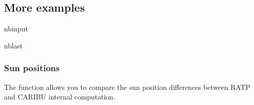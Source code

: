 \documentclass[letterpaper,10pt,english]{sphinxmanual}
\begin{document}
\subsection{More examples}
\label{\detokenize{more_examples:More-examples}}\label{\detokenize{more_examples::doc}}
\begin{sphinxuseclass}{nbinput}
\begin{sphinxuseclass}{nblast}
{
\begin{sphinxVerbatim}[commandchars=\\\{\}]
\llap{\color{nbsphinxin}[1]:\,\hspace{\fboxrule}\hspace{\fboxsep}}   
   
   
\end{sphinxVerbatim}
}

\end{sphinxuseclass}
\end{sphinxuseclass}

\subsubsection{Sun positions}
\label{\detokenize{more_examples:Sun-positions}}
\sphinxAtStartPar
The  function allows you to compare the sun position differences between RATP and CARIBU internal computation.
\end{document}
